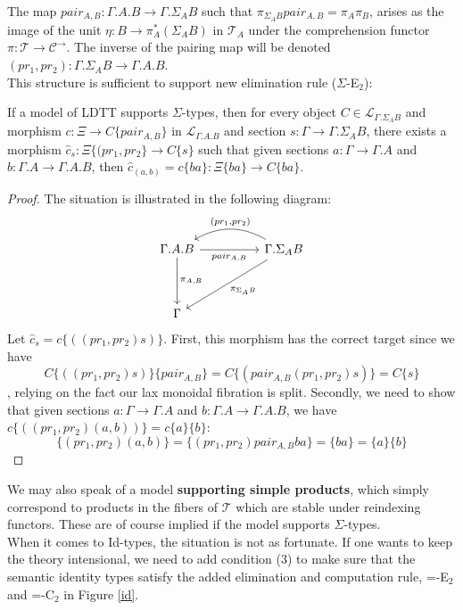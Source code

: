 The map $pair_{A, B} : \Gamma.A.B \to \Gamma.\Sigma_AB$ such that $\pi_{\Sigma_AB}pair_{A,B} = \pi_A\pi_B$, arises as the image of the unit $\eta : B \to \pi_A^*(\Sigma_AB)$ in $\mathcal{T}_A$ under the comprehension functor $\pi : \mathcal{T} \to \mathcal{C}^{\to}$. The inverse of the pairing map will be denoted $(pr_1, pr_2) : \Gamma.\Sigma_AB \to \Gamma.A.B$.\\
This structure is sufficient to support new elimination rule ($\Sigma$-E$_2$):
\begin{thm}
If a model of LDTT supports $\Sigma$-types, then for every object $C \in \mathcal{L}_{\Gamma.\Sigma_AB}$ and morphism $c : \Xi \to C\{pair_{A,B}\}$ in $\mathcal{L}_{\Gamma.A.B}$ and section $s : \Gamma \to \Gamma.\Sigma_AB$, there exists a morphism $\hat c_s : \Xi\{(pr_1, pr_2\} \to C\{s\}$ such that given sections $a : \Gamma \to \Gamma.A$ and $b : \Gamma.A \to \Gamma.A.B$, then $\hat c_{(a, b)} = c\{ba\} : \Xi\{ba\} \to C\{ba\}$.
\begin{proof}
  The situation is illustrated in the following diagram:
    \[
      \ti
      \Gamma.A.B \ar[d, "\pi_{A,B}"] \ar[r,"pair_{A,B}",swap] & \Gamma.\Sigma_AB \ar[l,"{(pr_1, pr_2)}",bend right,swap] \ar[dl, "\pi_{\Sigma_AB}"]\\
      \Gamma &
      \kz
    \]
Let $\hat c_s = c\{((pr_1, pr_2)s)\}$. First, this morphism has the correct target since we have
    \[
      C\{((pr_1,pr_2)s)\}\{pair_{A,B}\} = C\{(pair_{A,B}(pr_1,pr_2)s)\} = C\{s\}
    \]
    , relying on the fact our lax monoidal fibration is split. Secondly, we need to show that given sections $a : \Gamma \to \Gamma.A$ and $b : \Gamma.A \to \Gamma.A.B$, we have $c\{((pr_1,pr_2)(a, b))\} = c\{a\}\{b\}$:
    \[
      \{(pr_1,pr_2)(a, b)\} = \{(pr_1,pr_2)pair_{A,B}ba\} = \{ba\} = \{a\}\{b\}
    \]
  \end{proof}
\end{thm}
We may also speak of a model \textbf{supporting simple products}, which simply correspond to products in the fibers of $\mathcal{T}$ which are stable under reindexing functors. These are of course implied if the model supports $\Sigma$-types.\\
When it comes to Id-types, the situation is not as fortunate. If one wants to keep the theory intensional, we need to add condition (3) to make sure that the semantic identity types satisfy the added elimination and computation rule, =-E$_2$ and =-C$_2$ in Figure \ref{id}.
